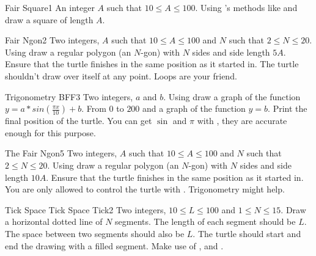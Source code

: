 
\begin{task}{Fair Square}{1}
\In
An integer $A$ such that $10 \leq A \leq 100$.
\Out
Using 's methods like 
 and  draw a square of length $A$.
\end{task}

\begin{task}{Fair Ngon}{2}
\In
Two integers, $A$ such that $10 \leq A \leq 100$ and $N$
such that $2 \leq N \leq 20$.
\Out
Using  draw a regular polygon (an $N$-gon) with $N$ sides and side
length $5A$. Ensure that the turtle finishes in the same position as it started
in. The turtle shouldn't draw over itself at any point.
\Hint
Loops are your friend.
\end{task}

\begin{task}{Trigonometry BFF}{3}
\In
Two integers, $a$ and $b$.
\Out
Using  draw a graph of the function $y = a * sin(\frac{\pi x}{10}) + b$.
From $0$ to $200$ and a graph of the function $y = b$. Print the final position
of the turtle.
\Hint
You can get $\sin$ and $\pi$ with , they are accurate
enough for this purpose.
\end{task}

\begin{task}{The Fair Ngon}{5}
\In
Two integers, $A$ such that $10 \leq A \leq 100$ and $N$
such that $2 \leq N \leq 20$.
\Out
Using  draw a regular polygon (an $N$-gon) with $N$ sides and side
length $10A$. Ensure that the turtle finishes in the same position as it started
in. You are only allowed to control the turtle with .
\Hint
Trigonometry might help.
\end{task}

\begin{task}{Tick Space Tick Space Tick}{2}
\In
Two integers, $10 \leq L \leq 100$ and $1 \leq N \leq 15$.
\Out
Draw a horizontal dotted line of $N$ segments. 
The length of each segment should be $L$.
The space between two segments should also be $L$.
\Note
The turtle should start and end the drawing with a filled segment.
\Hint
Make use of ,  and .
\end{task}
